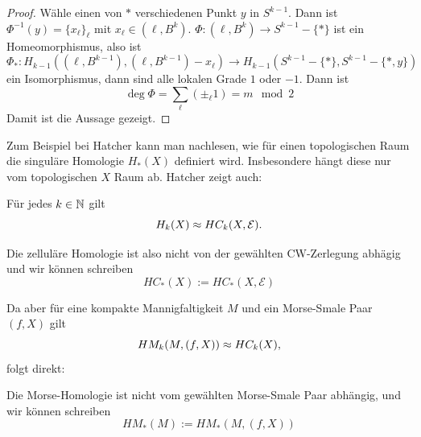 \begin{proof}
    Wähle einen von $\ast$ verschiedenen Punkt $y$ in $S^{k - 1}$. Dann ist 
    $\Phi^{-1}(y) = \{ x_{\ell} \}_{\ell}$ mit $x_{\ell} \in (\ell, B^k)$. 
    $\Phi \colon (\ell, B^k) \to S^{k - 1} - \{ \ast \}$ ist ein Homeomorphismus, also ist 
    \[ \Phi_{\ast} \colon H_{k - 1} ((\ell, B^{k - 1}), (\ell, B^{k - 1}) - x_{\ell}) \to 
        H_{k - 1}(S^{k - 1} - \{ \ast \}, S^{k - 1} - \{ \ast, y \}) \]
    ein Isomorphismus, dann sind alle lokalen Grade $1$ oder $-1$. Dann ist 
    \[ \deg \Phi = \sum_{\ell} (\pm_{\ell} 1) = m \mod 2 \]
    Damit ist die Aussage gezeigt.
\end{proof}

Zum Beispiel bei Hatcher \cite{hatcher} kann man nachlesen, wie für einen topologischen Raum die 
singuläre Homologie $H_{\ast} (X)$ definiert wird. Insbesondere hängt diese nur vom topologischen 
$X$ Raum ab. Hatcher zeigt auch: 

\begin{theorem}
    \label{satz: zellulaere Homologie ist singuläre Homologie}
    Für jedes $k \in { \mathbb N }$ gilt 
    \[ H_k (X) \approx HC_k (X, \mathcal{E}) . \]
\end{theorem}

Die zelluläre Homologie ist also nicht von der gewählten CW-Zerlegung abhägig und wir können schreiben
\[ HC_{\ast} (X) := HC_{\ast} (X, \mathcal{E}) \]

Da aber für eine kompakte Mannigfaltigkeit $M$ und ein Morse-Smale Paar $(f, X)$ gilt 
\[ HM_k(M, (f, X)) \approx HC_k(X) , \]
folgt direkt:

\begin{theorem}
    Die Morse-Homologie ist nicht vom gewählten Morse-Smale Paar abhängig, und wir können schreiben
    \[ HM_{\ast} (M) := HM_{\ast}(M, (f, X)) \]
\end{theorem}
